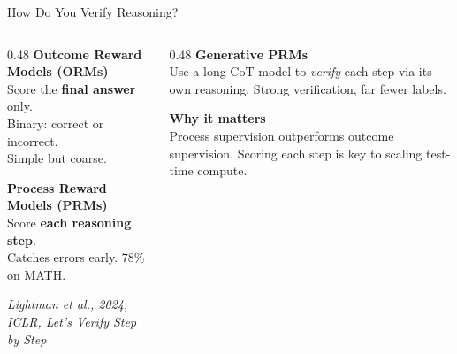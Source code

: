 \documentclass[aspectratio=169, 12pt, xcolor=dvipsnames]{beamer}
\newcommand{\papercite}[4]{\emph{#1, #2, #3, #4}}
\begin{document}
\begin{frame}{How Do You Verify Reasoning?}

\begin{columns}[T]
  \begin{column}{0.48\textwidth}
    \textbf{Outcome Reward Models (ORMs)}\\[0.3em]
    {\small Score the \textbf{final answer} only.\\
    Binary: correct or incorrect.\\
    Simple but coarse.}

    \vspace{1em}
    \textbf{Process Reward Models (PRMs)}\\[0.3em]
    {\small Score \textbf{each reasoning step}.\\
    Catches errors early. 78\% on MATH.}

    \vspace{0.3em}
    {\scriptsize \papercite{Lightman et al.}{2024}{ICLR}{Let's Verify Step by Step}}
  \end{column}
  \begin{column}{0.48\textwidth}
    \textbf{Generative PRMs}\\[0.3em]
    {\small Use a long-CoT model to \emph{verify}
    each step via its own reasoning.
    Strong verification, far fewer labels.}

    \vspace{0.8em}
    \textbf{Why it matters}\\[0.3em]
    {\small Process supervision outperforms outcome
    supervision. Scoring each step is key to
    scaling test-time compute.}
  \end{column}
\end{columns}

\end{frame}
\end{document}
